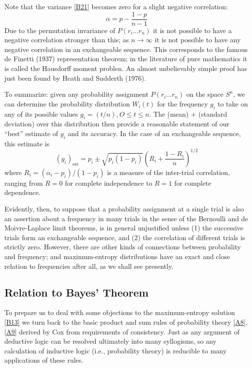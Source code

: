 Note that the variance \eqref{B21} becomes zero for a slight negative correlation:
\begin{equation}
	\label{B22}
	\alpha = p - \frac{1-p}{n-1}
\end{equation}
Due to the permutation invariance of $P(r_i\ldots r_n)$ it is not possible to have a negative correlation stronger than this; as $n\to \infty$ it is not possible to have any negative correlation in an exchangeable sequence.
This corresponds to the famous de Finetti (1937) representation theorem; in the literature of pure mathematics it is called the Hausdorff moment problen.
An almost unbelievably simple proof has just been found by Heath and Sudderth (\cite{heath}{1976}).

To summarize: given any probability assignment $P(r_i\ldots r_n)$ on the space $S^n$, we can determine the probability distribution $W_i(t)$ for the frequency $g_i$ to take on any of its possible values $g_i = (t/n), O\leq t\leq n$.
The (mean) + (standard deviation) over this distribution then provide a reasonable statement of our ``best'' estimate of $g_i$ and its accuracy. In the case of an exchangeable sequence, this estimate is
\begin{equation}
	\label{B23}
	(g_i)_{\mathrm{est}} = p_i \pm \sqrt{p_i (1 - p_i)} \left(R_i + \frac{1-R_i}{n}\right)^{1/2}
\end{equation}
where $R_i = (\alpha_i-p_i)/(1-p_i)$ is a measure of the inter-trial correlation, ranging from $R=0$ for complete independence to $R=1$ for complete dependence.

Evidently, then, to suppose that a probability assignment at a single trial is also an assertion about a frequency in many trials in the sense of the Bernoulli and de Moivre-Laplace limit theorems, is in general unjustified unless (1) the successive trials form an exchangeable sequence, and (2) the correlation of different trials is strictly zero.
However, there are other kinds of connections between probability and frequency; and maximum-entropy distributions have an exact and close relation to frequencies after all, as we shall see presently.


\subsection{Relation to Bayes' Theorem}
To prepare us to deal with some objections to the maximum-entropy solution \eqref{B13} we turn back to the basic product and sum rules of probability theory \eqref{A8}, \eqref{A9} derived by \cite{cox}{Cox} from requirements of consistency.
Just as any argument of deductive logic can be resolved ultimately into many syllogisms, so any calculation of inductive logic (i.e., probability theory) is reducible to many applications of these rules.

